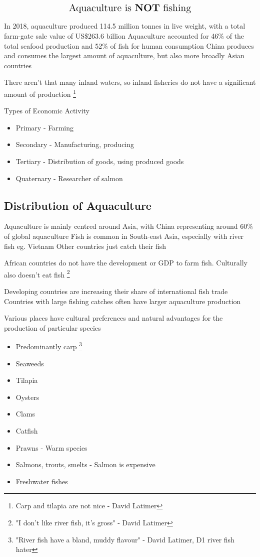 	\begin{align*}
		\text{\Large Aquaculture is \textbf{NOT} fishing}
	\end{align*}

	 In 2018, aquaculture produced 114.5 million tonnes in live weight, with a total farm-gate sale value of US\$263.6 billion
	Aquaculture accounted for 46\% of the total seafood production and 52\% of fish for human consumption
	China produces and consumes the largest amount of aquaculture, but also more broadly Asian countries

	There aren't that many inland waters, so inland fisheries do not have a significant amount of production \footnote{Carp and tilapia are not nice - David Latimer}

	Types of Economic Activity
	\begin{itemize}
		\item Primary - Farming
		\item Secondary - Manufacturing, producing
		\item Tertiary - Distribution of goods, using produced goods
		\item Quaternary - Researcher of salmon
	\end{itemize}

	\subsection{Distribution of Aquaculture}
		Aquaculture is mainly centred around Asia, with China representing around 60\% of global aquaculture
		Fish is common in South-east Asia, especially with river fish eg. Vietnam
		Other countries just catch their fish

		African countries do not have the development or GDP to farm fish. Culturally also doesn't eat fish
		\footnote{"I don't like river fish, it's gross" - David Latimer}

		Developing countries are increasing their share of international fish trade
		Countries with large fishing catches often have larger aquaculture production
		
		Various places have cultural preferences and natural advantages for the production of particular species
		\begin{itemize}
			\item Predominantly carp \footnote{"River fish have a bland, muddy flavour" - David Latimer, D1 river fish hater}
			\item Seaweeds
			\item Tilapia
			\item Oysters
			\item Clams
			\item Catfish
			\item Prawns - Warm species
			\item Salmons, trouts, smelts - Salmon is expensive
			\item Freshwater fishes
		\end{itemize}

